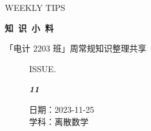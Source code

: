 \documentclass[UTF8]{ctexart}
\newcommand\Black[1]{\textcolor[gray]{0.3}{#1}}
\newcommand\Brown[1]{\textcolor[HTML]{998A4E}{#1}}
\newcommand\IssueNumber{11}
\newcommand\Date{2023-11-25}
\newcommand\Subject{离散数学}
\begin{document}
\BgThispage
\begin{center}
{\scriptsize\Issue \textcolor[HTML]{C8BA83}{WEEKLY TIPS}}

{\Huge\bfseries\TitleFont \Black{知\ 识\ 小\ 料}}

\vspace{-0.1cm}
{\footnotesize \Brown{「电计 2203 班」周常规知识整理共享}}
\end{center}

\vspace{-0.5cm}

\begin{figure}[H]
\hspace{1cm}
\begin{minipage}[t]{0.3\textwidth}
\centering
    \Brown{ISSUE.}

    \vspace{-0.6cm}
    \Huge \Issue\slshape\bfseries\Black{\IssueNumber}
\end{minipage}
\hfill
\begin{minipage}[t]{0.3\textwidth}
\centering
    \Brown{日期：\Date} \\
\vspace{-0.1cm}
    \Brown{学科：\Subject} \\
\end{minipage}
\vspace{-0.2cm}
\end{figure}
\end{document}
